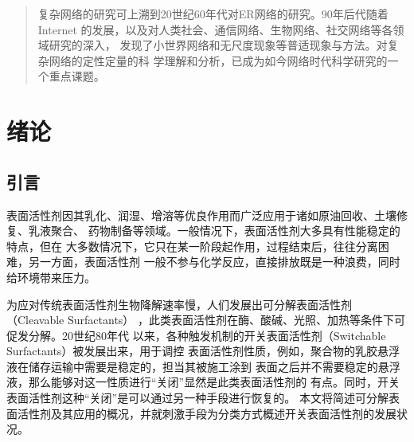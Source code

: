 \documentclass[bachelor,winfonts]{jnuthesis} %
\author{陈育明}
\institute{江南大学}
\begin{document}
    \maketitle
    \frontmatter
    \begin{abstract}
        复杂网络的研究可上溯到20世纪60年代对ER网络的研究。90年后代随着Internet
        的发展，以及对人类社会、通信网络、生物网络、社交网络等各领域研究的深入，
        发现了小世界网络和无尺度现象等普适现象与方法。对复杂网络的定性定量的科
        学理解和分析，已成为如今网络时代科学研究的一个重点课题。
    \end{abstract}
    
    \begin{englishabstract}
        \blindtext
    \end{englishabstract}
    
    \tableofcontents
    
    \mainmatter
    
    \chapter{绪论}\label{chapter_introduction}
    \section{引言}
    表面活性剂因其乳化、润湿、增溶等优良作用而广泛应用于诸如原油回收、土壤修复、乳液聚合、
    药物制备等领域\cite{秦勇2009}。一般情况下，表面活性剂大多具有性能稳定的特点，但在
    大多数情况下，它只在某一阶段起作用，过程结束后，往往分离困难，另一方面，表面活性剂
    一般不参与化学反应，直接排放既是一种浪费，同时给环境带来压力\cite{秦勇2009}。
    
    为应对传统表面活性剂生物降解速率慢，人们发展出可分解表面活性剂（Cleavable Surfactants）
    ，此类表面活性剂在酶、酸碱、光照、加热等条件下可促发分解\cite{hellberg2000}。20世纪80年代
    以来，各种触发机制的开关表面活性剂（Switchable Surfactants）被发展出来，用于调控
    表面活性剂性质，例如，聚合物的乳胶悬浮液在储存运输中需要是稳定的，担当其被施工涂到
    表面之后并不需要稳定的悬浮液，那么能够对这一性质进行“关闭”显然是此类表面活性剂的
    有点\cite{jessop2012}。同时，开关表面活性剂这种“关闭”是可以通过另一种手段进行恢复的。
    本文将简述可分解表面活性剂及其应用的概况，并就刺激手段为分类方式概述开关表面活性剂的发展状况。
    
\end{document}
